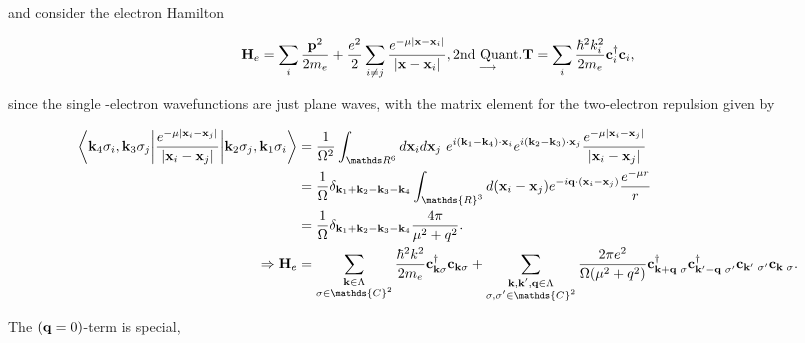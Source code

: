 \documentclass{homework}
\begin{document}
and consider the electron Hamilton

\begin{equation}
    {\bf H}_e = \sum_{i} \frac{{\bf p}^2}{2m_e} + \frac{e^2}{2} \sum_{i\neq j}\frac{e^{-\mu |{\bf x}-{\bf x}_i|}}{|{\bf x}-{\bf x}_i|}, \underset{\longrightarrow}{\textnormal{2nd Quant.}} {\bf T} = \sum_{i} \frac{\hbar^2 k_i^2}{2m_e} {\bf c}_i^\dagger {\bf c}_i,
\end{equation}

since the single -electron wavefunctions are just plane waves, with the matrix element for the two-electron repulsion given by 

\begin{equation}
    \begin{split}
        \bigg\langle {{\bf k}_4 \sigma_i, {\bf k}_3 \sigma_j}\bigg| \frac{e^{-\mu |{\bf x}_i - {\bf x}_j|}}{|{\bf x}_i- {\bf x}_j|} \bigg|{{\bf k}_2 \sigma_j, {\bf k}_1 \sigma_i} \bigg\rangle &= \frac{1}{\Omega^2} \int_{\R^6} d{\bf x}_i d{\bf x}_j \blanky e^{i({\bf k}_1 - {\bf k}_4) \cdot {\bf x}_i} e^{i({\bf k}_2 - {\bf k}_3) \cdot {\bf x}_j} \frac{e^{-\mu |{\bf x}_i - {\bf x}_j|}}{|{\bf x}_i- {\bf x}_j|} \\
        &= \frac{1}{\Omega} \delta_{{\bf k}_1+{\bf k}_2 - {\bf k}_3 - {\bf k}_4} \int_{\mathds{R}^3} d({\bf x}_i - {\bf x}_j) e^{-i {\bf q} \cdot ({\bf x}_i-{\bf x}_j)} \frac{e^{-\mu r}}{r} \\
        &= \frac{1}{\Omega} \delta_{{\bf k}_1+{\bf k}_2 - {\bf k}_3 - {\bf k}_4} \frac{4\pi}{\mu^2 + q^2}. \\
    \Rightarrow {\bf H}_e &= \sum_{\substack{{\bf k} \in \Lambda\\
    \sigma \in \mathds{C}^2}} \frac{\hbar^2 k^2}{2m_e} {\bf c}_{{\bf k} \sigma}^\dagger {\bf c}_{{\bf k} \sigma} +  \sum_{\substack{{\bf k},{\bf k}',{\bf q} \in \Lambda\\
    \sigma, \sigma' \in \mathds{C}^2}} \frac{2\pi e^2}{\Omega(\mu^2 + q^2)} {\bf c}_{{\bf k}+{\bf q} \blanky \sigma}^\dagger {\bf c}_{{\bf k}'-{\bf q} \blanky \sigma'}^\dagger {\bf c}_{{\bf k}' \blanky \sigma'} {\bf c}_{{\bf k} \blanky \sigma}.
    \label{pre-HF-jellium H}
    \end{split} 
\end{equation}

The $({\bf q}=0)$-term is special, 
\end{document}
